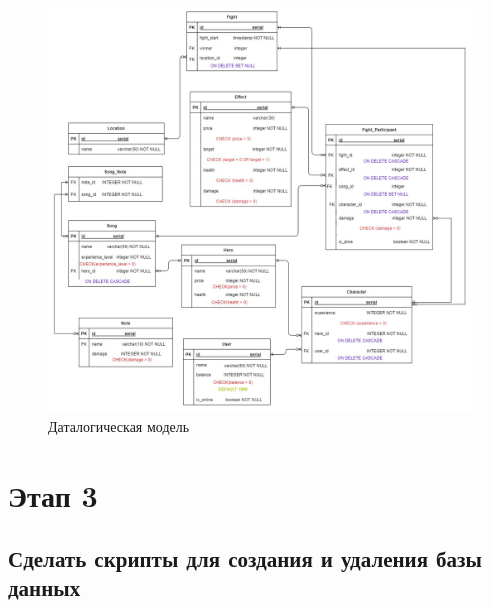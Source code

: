 \begin{figure}[H]
	\begin{center}
		\includegraphics[scale=0.44]{images/Datalogical.jpg}
		\caption{Даталогическая модель}
		\label{pic:pic_name} %
	\end{center}
\end{figure}

\newpage

\section*{Этап 3}

\subsection*{Сделать скрипты для создания и удаления базы данных}

